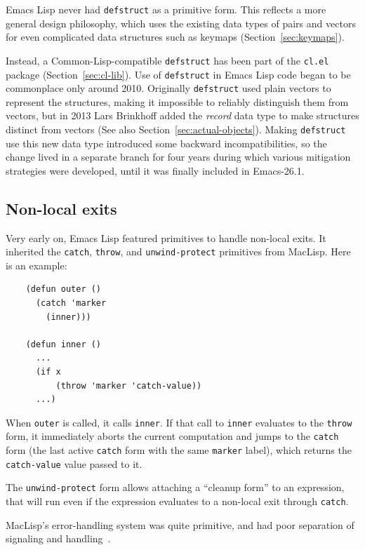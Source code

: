 \documentclass[format=acmsmall, review]{acmart}
\newcommand \Elisp {Emacs Lisp}
\begin{document}
\Elisp{} never had \texttt{defstruct} as a primitive form.  This
reflects a more general design philosophy, which uses the existing
data types of pairs and vectors for even complicated data structures
such as keymaps (Section~\ref{sec:keymaps}).

Instead, a Common-Lisp-compatible \texttt{defstruct} has been part of the
\texttt{cl.el} package (Section~\ref{sec:cl-lib}).  Use of
\texttt{defstruct} in \Elisp{} code began to be commonplace only around
2010.  Originally \texttt{defstruct} used plain vectors to represent the
structures, making it impossible to reliably distinguish them from vectors,
but in 2013 Lars Brinkhoff added the \emph{record} data type to make
structures distinct from vectors (See also
Section~\ref{sec:actual-objects}).  Making \texttt{defstruct} use this new
data type introduced some backward incompatibilities, so the change lived in
a separate branch for four years during which various mitigation strategies
were developed, until it was finally included in Emacs-26.1.

\subsection{Non-local exits}
\label{sec:non-local-exits}

Very early on, \Elisp{} featured primitives to handle
non-local exits.  It inherited the \texttt{catch}, \texttt{throw}, and
\texttt{unwind-protect} primitives from MacLisp.  Here is an example:
%
\begin{verbatim}
    (defun outer ()
      (catch 'marker
        (inner)))
    
    (defun inner ()
      ...
      (if x
          (throw 'marker 'catch-value))
      ...)
\end{verbatim}
%
When \texttt{outer} is called, it calls \texttt{inner}.  If that call
to \texttt{inner} evaluates to the \texttt{throw} form, it immediately
aborts the current computation and jumps to the \texttt{catch} form
(the last active \texttt{catch} form with the same \texttt{marker}
label), which returns the \texttt{catch-value} value passed to it.

The \texttt{unwind-protect} form allows attaching a ``cleanup form''
to an expression, that will run even if the expression evaluates to a
non-local exit through \texttt{catch}.

MacLisp's error-handling system was quite primitive, and had poor separation
of signaling and handling~\cite{Pitman2001}.
\end{document}
